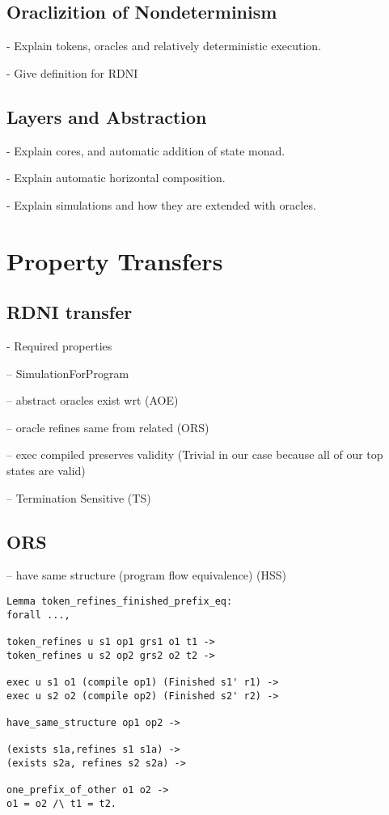 \iffalse 
\subsection{Oraclizition of Nondeterminism}
- Explain tokens, oracles and relatively deterministic execution.

- Give definition for RDNI

\subsection{Layers and Abstraction}

- Explain cores, and automatic addition of state monad.

- Explain automatic horizontal composition.

- Explain simulations and how they are extended with oracles.

\section{Property Transfers}


\subsection{RDNI transfer}
- Required properties

-- SimulationForProgram
    
-- abstract oracles exist wrt (AOE)

-- oracle refines same from related (ORS)

-- exec compiled preserves validity (Trivial in our case because all of our top states are valid)

-- Termination Sensitive (TS)

\subsection{ORS}
-- have same structure (program flow equivalence) (HSS)

\begin{verbatim}
Lemma token_refines_finished_prefix_eq:
forall ...,

token_refines u s1 op1 grs1 o1 t1 ->
token_refines u s2 op2 grs2 o2 t2 ->

exec u s1 o1 (compile op1) (Finished s1' r1) ->
exec u s2 o2 (compile op2) (Finished s2' r2) ->

have_same_structure op1 op2 -> 

(exists s1a,refines s1 s1a) ->
(exists s2a, refines s2 s2a) ->

one_prefix_of_other o1 o2 ->
o1 = o2 /\ t1 = t2.
\end{verbatim}

